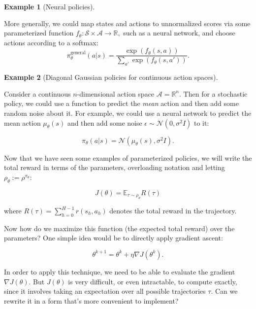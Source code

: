 \documentclass[
  letterpaper,
  DIV=11,
  numbers=noendperiod]{scrreprt}
\theoremstyle{plain}
\theoremstyle{plain}
\theoremstyle{definition}
\newtheorem{example}{Example}[chapter]
\theoremstyle{definition}
\theoremstyle{remark}
\begin{document}
\begin{example}[Neural
policies]\protect\hypertarget{exm-neural-policy}{}\label{exm-neural-policy}

More generally, we could map states and actions to unnormalized scores
via some parameterized function
\(f_\theta : \mathcal{S} \times \mathcal{A} \to \mathbb{R},\) such as a
neural network, and choose actions according to a softmax:
\[\pi^\text{general}_\theta(a|s) = \frac{\exp(f_{\theta}(s,a))}{\sum_{a'} \exp(f_{\theta}(s,a'))}.\]

\end{example}

\begin{example}[Diagonal Gaussian policies for continuous action
spaces]\protect\hypertarget{exm-gaussian-policy}{}\label{exm-gaussian-policy}

Consider a continuous \(n\)-dimensional action space
\(\mathcal{A} = \mathbb{R}^n\). Then for a stochastic policy, we could
use a function to predict the \emph{mean} action and then add some
random noise about it. For example, we could use a neural network to
predict the mean action \(\mu_\theta(s)\) and then add some noise
\(\epsilon \sim \mathcal{N}(0, \sigma^2 I)\) to it:

\[\pi_\theta(a|s) = \mathcal{N}(\mu_\theta(s), \sigma^2 I).\]

\end{example}

Now that we have seen some examples of parameterized policies, we will
write the total reward in terms of the parameters, overloading notation
and letting \(\rho_\theta := \rho^{\pi_\theta}\):

\[J(\theta) = \mathbb{E}_{\tau \sim \rho_\theta} R(\tau)\]

where \(R(\tau) = \sum_{h=0}^{H-1} r(s_h, a_h)\) denotes the total
reward in the trajectory.

Now how do we maximize this function (the expected total reward) over
the parameters? One simple idea would be to directly apply gradient
ascent:

\[
\theta^{k+1} = \theta^k + \eta \nabla J(\theta^k).
\]

In order to apply this technique, we need to be able to evaluate the
gradient \(\nabla J(\theta).\) But \(J(\theta)\) is very difficult, or
even intractable, to compute exactly, since it involves taking an
expectation over all possible trajectories \(\tau.\) Can we rewrite it
in a form that's more convenient to implement?
\end{document}
